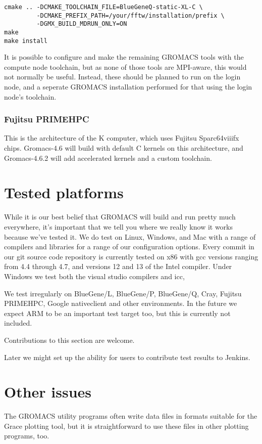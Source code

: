 \documentclass{article}[12pt,a4paper,twoside]
\newcommand{\gromacs}{GROMACS}
\newcommand{\mpi}{MPI}
\newcommand{\grace}{Grace}
\begin{document}
\begin{verbatim}
cmake .. -DCMAKE_TOOLCHAIN_FILE=BlueGeneQ-static-XL-C \
         -DCMAKE_PREFIX_PATH=/your/fftw/installation/prefix \
         -DGMX_BUILD_MDRUN_ONLY=ON
make
make install
\end{verbatim}
It is possible to configure and make the remaining \gromacs{} tools
with the compute node toolchain, but as none of those tools are
\mpi{}-aware, this would not normally be useful. Instead, these should
be planned to run on the login node, and a seperate \gromacs{}
installation performed for that using the login node's toolchain.

\subsubsection{Fujitsu PRIMEHPC}

This is the architecture of the K computer, which uses Fujitsu Sparc64viiifx 
chips. Gromacs-4.6 will build with default C kernels on this architecture,
and Gromacs-4.6.2 will add accelerated kernels and a custom toolchain.

\section{Tested platforms}

While it is our best belief that \gromacs{} will build and run pretty
much everywhere, it's important that we tell you where we really know
it works because we've tested it. We do test on Linux, Windows, and
Mac with a range of compilers and libraries for a range of our
configuration options. Every commit in our git source code
repository is currently tested on x86 with gcc versions ranging
from 4.4 through 4.7, and versions 12 and 13 of the Intel compiler.
Under Windows we test both the visual studio compilers and icc,

We test irregularly on BlueGene/L, BlueGene/P, BlueGene/Q, Cray, 
Fujitsu PRIMEHPC, Google nativeclient and other environments. In 
the future we expect ARM to be an important test target too, but this
is currently not included.

Contributions to this section are welcome.

Later we might set up the ability for users to contribute test results
to Jenkins.

\section{Other issues}

The \gromacs{} utility programs often write data files in formats
suitable for the \grace{} plotting tool, but it is straightforward to
use these files in other plotting programs, too.
\end{document}
